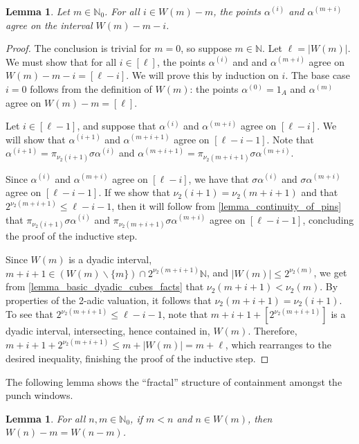 \documentclass[letter,11pt]{article}
\theoremstyle{plain}
\newtheorem{lemma}[theorem]{Lemma}
\theoremstyle{definition}
\theoremstyle{plain}
\theoremstyle{plain}
\numberwithin{equation}{section}
\newcommand{\N}{\mathbb{N}}
\renewcommand{\leq}{\leqslant}
\renewcommand{\setminus}{\backslash}
\newcommand{\apunch}{\alpha}
\begin{document}
\begin{lemma}
\label{lemma_second_coords_agree}
    Let $m \in \N_0$.  For all $i \in W(m) - m$, the points $\apunch^{(i)}$ and $\apunch^{(m+i)}$ agree on the interval $W(m) - m - i$.
\end{lemma}

\begin{proof}
The conclusion is trivial for $m = 0$, so suppose $m \in \N$. Let $\ell = |W(m)|$. We must show that for all $i \in [\ell]$, the points $\apunch^{(i)}$ and and $\apunch^{(m+i)}$ agree on $W(m) - m - i = [\ell - i]$.  We will prove this by induction on $i$.  The base case $i = 0$ follows from the definition of $W(m)$: the points $\apunch^{(0)} = 1_A$ and $\apunch^{(m)}$ agree on $W(m) - m = [\ell]$.

Let $i \in [\ell - 1]$, and suppose that $\apunch^{(i)}$ and $\apunch^{(m+i)}$ agree on $[\ell - i]$.  We will show that $\apunch^{(i+1)}$ and $\apunch^{(m+i+1)}$ agree on $[\ell - i - 1]$.  Note that $\apunch^{(i+1)} = \pi_{\nu_2(i+1)} \sigma \apunch^{(i)}$ and $\apunch^{(m+i+1)} = \pi_{\nu_2(m+i+1)} \sigma \apunch^{(m+i)}$.



Since $\apunch^{(i)}$ and $\apunch^{(m+i)}$ agree on $[\ell - i]$, we have that $\sigma \apunch^{(i)}$ and $\sigma \apunch^{(m+i)}$ agree on $[\ell - i - 1]$.  If we show that $\nu_2(i+1) = \nu_2(m+i+1)$ and that $2^{\nu_2(m+i+1)} \leq \ell - i - 1$, then it will follow from \cref{lemma_continuity_of_pins} that $\pi_{\nu_2(i+1)} \sigma \apunch^{(i)}$ and $\pi_{\nu_2(m+i+1)} \sigma \apunch^{(m+i)}$ agree on $[\ell - i - 1]$, concluding the proof of the inductive step.

Since $W(m)$ is a dyadic interval, $m+i+1 \in (W(m) \setminus \{m\}) \cap 2^{\nu_2(m+i+1)} \N$, and $|W(m)| \leq 2^{\nu_2(m)}$, we get from \cref{lemma_basic_dyadic_cubes_facts} that $\nu_2(m+i+1) < \nu_2(m)$.  By properties of the 2-adic valuation, it follows that $\nu_2(m+i+1) = \nu_2(i+1)$. To see that $2^{\nu_2(m+i+1)} \leq \ell - i - 1$, note that $m+i+1+[2^{\nu_2(m+i+1)}]$ is a dyadic interval, intersecting, hence contained in, $W(m)$.  Therefore, $m+i+1+2^{\nu_2(m+i+1)} \leq m + |W(m)| = m + \ell$, which rearranges to the desired inequality, finishing the proof of the inductive step.
\end{proof}

The following lemma shows the ``fractal'' structure of containment amongst the punch windows.

\begin{lemma}
\label{lemma_fractal_windows}
    For all $n, m \in \N_0$, if $m < n$ and $n \in W(m)$, then $W(n)-m = W(n-m)$.
\end{lemma}
\end{document}
